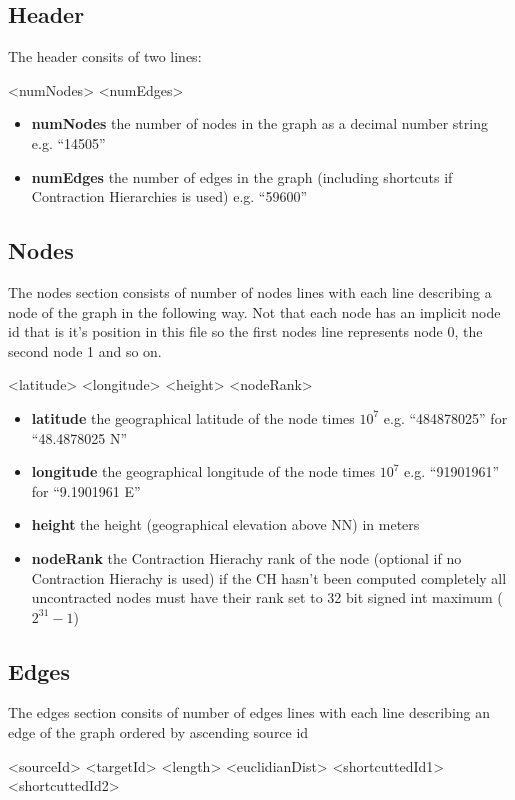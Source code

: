 \documentclass[ngerman,titlepage,parskip=true]{scrartcl}
\begin{document}
\subsection{Header}
The header consits of two lines:
\begin{verbatim*}
<numNodes>
<numEdges>
\end{verbatim*}

\begin{itemize}
 \item 
 \textbf{numNodes} the number of nodes in the graph as a decimal number string e.g. ``14505''
 \item
 \textbf{numEdges} the number of edges in the graph (including shortcuts if Contraction Hierarchies is used) e.g. ``59600''
\end{itemize}


\subsection{Nodes}
The nodes section consists of number of nodes lines with each line describing a node of the graph in the following way.
Not that each node has an implicit node id that is it's position in this file so the first nodes line
represents node 0, the second node 1 and so on.
\begin{verbatim*}
<latitude> <longitude> <height> <nodeRank>
\end{verbatim*}

\begin{itemize}
\item \textbf{latitude} the geographical latitude of the node times $10^7$ e.g. ``484878025'' for ``48.4878025 N''
\item \textbf{longitude} the geographical longitude of the node times $10^7$ e.g. ``91901961'' for ``9.1901961 E''
\item \textbf{height} the height (geographical elevation above NN) in meters
\item \textbf{nodeRank} the Contraction Hierachy rank of the node (optional if no Contraction Hierachy is used) if the
CH hasn't been computed completely all uncontracted nodes must have their rank set to 32 bit signed int maximum ($2^{31} - 1$) 
\end{itemize}

\subsection{Edges}
The edges section consits of number of edges lines with each line describing an edge of the graph ordered by ascending source id
\begin{verbatim*}
<sourceId> <targetId> <length> <euclidianDist> <shortcuttedId1> <shortcuttedId2>
\end{verbatim*}
\end{document}
